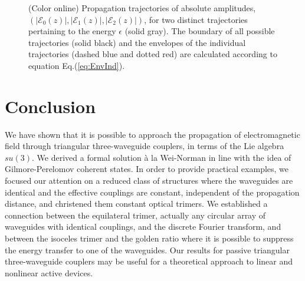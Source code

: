\documentclass[9pt,twocolumn,twoside]{osajnl}
\begin{document}
\begin{figure}[htbp]
	\centering
	\caption{(Color online) Propagation trajectories of absolute amplitudes, $(\vert \mathcal{E}_{0}(z) \vert, \vert \mathcal{E}_{1}(z) \vert, \vert \mathcal{E}_{2}(z) \vert )$,  for two 
		distinct trajectories pertaining to the energy $\epsilon$ (solid gray). The boundary of all possible trajectories (solid black) and the envelopes of the individual  trajectories (dashed blue and dotted red) are calculated according to equation Eq.(\ref{eq:EnvInd}).} 
	
	\label{fig:Fig7}
\end{figure}


\section{Conclusion}
We have shown that it is possible to approach the propagation of electromagnetic field through triangular three-waveguide couplers, in terms of the Lie algebra $su(3)$. 
We derived a formal solution \`a la Wei-Norman in line with the idea of Gilmore-Perelomov coherent states.
In order to provide practical examples, we focused our attention on a reduced class of structures where the waveguides are identical and the effective couplings are constant, independent of the propagation distance, and christened them constant optical trimers. 
We established a connection between the equilateral trimer, actually any circular array of waveguides with identical couplings, and the discrete Fourier transform, and between the isoceles trimer and the golden ratio where it is possible to suppress the energy transfer to one of the waveguides. 
Our results for passive triangular three-waveguide couplers may be useful for a theoretical approach to linear and nonlinear active devices.
\end{document}
